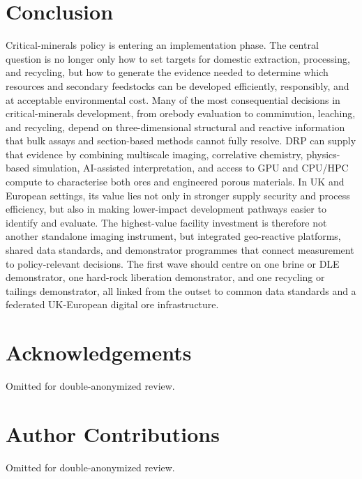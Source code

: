 \documentclass[12pt,a4paper]{article}
\begin{document}
\section{Conclusion}
Critical-minerals policy is entering an implementation phase. The central question is no longer only how to set targets for domestic extraction, processing, and recycling, but how to generate the evidence needed to determine which resources and secondary feedstocks can be developed efficiently, responsibly, and at acceptable environmental cost. Many of the most consequential decisions in critical-minerals development, from orebody evaluation to comminution, leaching, and recycling, depend on three-dimensional structural and reactive information that bulk assays and section-based methods cannot fully resolve. DRP can supply that evidence by combining multiscale imaging, correlative chemistry, physics-based simulation, AI-assisted interpretation, and access to GPU and CPU/HPC compute to characterise both ores and engineered porous materials. In UK and European settings, its value lies not only in stronger supply security and process efficiency, but also in making lower-impact development pathways easier to identify and evaluate. The highest-value facility investment is therefore not another standalone imaging instrument, but integrated geo-reactive platforms, shared data standards, and demonstrator programmes that connect measurement to policy-relevant decisions. The first wave should centre on one brine or DLE demonstrator, one hard-rock liberation demonstrator, and one recycling or tailings demonstrator, all linked from the outset to common data standards and a federated UK-European digital ore infrastructure.

\section*{Acknowledgements}
Omitted for double-anonymized review.

\section*{Author Contributions}
Omitted for double-anonymized review.
\end{document}
